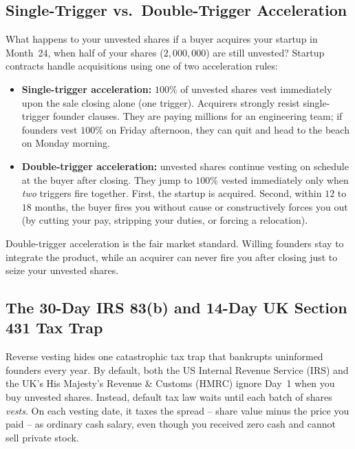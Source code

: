 \subsection{Single-Trigger vs.\ Double-Trigger Acceleration}
\label{subsec:acceleration-on-acquisition}

What happens to your unvested shares if a buyer acquires your startup in Month~24, when half of your shares ($2{,}000{,}000$) are still unvested? Startup contracts handle acquisitions using one of two acceleration rules:
\begin{itemize}
  \item \textbf{Single-trigger acceleration:} $100\%$ of unvested shares vest immediately upon the sale closing alone (one trigger). Acquirers strongly resist single-trigger founder clauses. They are paying millions for an engineering team; if founders vest $100\%$ on Friday afternoon, they can quit and head to the beach on Monday morning.
  \item \textbf{Double-trigger acceleration:} unvested shares continue vesting on schedule at the buyer after closing. They jump to $100\%$ vested immediately only when \emph{two} triggers fire together. First, the startup is acquired. Second, within $12$ to $18$ months, the buyer fires you without cause or constructively forces you out (by cutting your pay, stripping your duties, or forcing a relocation).
\end{itemize}
Double-trigger acceleration is the fair market standard. Willing founders stay to integrate the product, while an acquirer can never fire you after closing just to seize your unvested shares.

\subsection{The 30-Day IRS 83(b) and 14-Day UK Section 431 Tax Trap}
\label{subsec:section-83b-election}

Reverse vesting hides one catastrophic tax trap that bankrupts uninformed founders every year. By default, both the US Internal Revenue Service (IRS) and the UK's His Majesty's Revenue \& Customs (HMRC) ignore Day~1 when you buy unvested shares. Instead, default tax law waits until each batch of shares \emph{vests}. On each vesting date, it taxes the spread -- share value minus the price you paid -- as ordinary cash salary, even though you received zero cash and cannot sell private stock.

